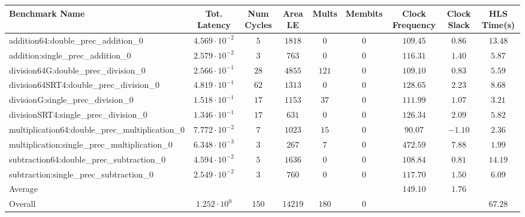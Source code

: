 \begin{tabular}{|l|c|c|c|c|c|c|c|c|}
\hline
Benchmark Name                                   & Tot. Latency            & Num Cycles & Area LE   & Mults   & Membits & Clock Frequency & Clock Slack & HLS Time(s) \\
\hline
addition64:double\_prec\_addition\_0             & $ 4.569 \cdot 10^{-2} $ & $ 5      $ & $ 1818  $ & $ 0   $ & $ 0   $ & $ 109.45      $ & $ 0.86    $ & $ 13.48   $ \\
addition:single\_prec\_addition\_0               & $ 2.579 \cdot 10^{-2} $ & $ 3      $ & $ 763   $ & $ 0   $ & $ 0   $ & $ 116.31      $ & $ 1.40    $ & $ 5.87    $ \\
division64G:double\_prec\_division\_0            & $ 2.566 \cdot 10^{-1} $ & $ 28     $ & $ 4855  $ & $ 121 $ & $ 0   $ & $ 109.10      $ & $ 0.83    $ & $ 5.59    $ \\
division64SRT4:double\_prec\_division\_0         & $ 4.819 \cdot 10^{-1} $ & $ 62     $ & $ 1313  $ & $ 0   $ & $ 0   $ & $ 128.65      $ & $ 2.23    $ & $ 8.68    $ \\
divisionG:single\_prec\_division\_0              & $ 1.518 \cdot 10^{-1} $ & $ 17     $ & $ 1153  $ & $ 37  $ & $ 0   $ & $ 111.99      $ & $ 1.07    $ & $ 3.21    $ \\
divisionSRT4:single\_prec\_division\_0           & $ 1.346 \cdot 10^{-1} $ & $ 17     $ & $ 631   $ & $ 0   $ & $ 0   $ & $ 126.34      $ & $ 2.09    $ & $ 5.82    $ \\
multiplication64:double\_prec\_multiplication\_0 & $ 7.772 \cdot 10^{-2} $ & $ 7      $ & $ 1023  $ & $ 15  $ & $ 0   $ & $ 90.07       $ & $ -1.10   $ & $ 2.36    $ \\
multiplication:single\_prec\_multiplication\_0   & $ 6.348 \cdot 10^{-3} $ & $ 3      $ & $ 267   $ & $ 7   $ & $ 0   $ & $ 472.59      $ & $ 7.88    $ & $ 1.99    $ \\
subtraction64:double\_prec\_subtraction\_0       & $ 4.594 \cdot 10^{-2} $ & $ 5      $ & $ 1636  $ & $ 0   $ & $ 0   $ & $ 108.84      $ & $ 0.81    $ & $ 14.19   $ \\
subtraction:single\_prec\_subtraction\_0         & $ 2.549 \cdot 10^{-2} $ & $ 3      $ & $ 760   $ & $ 0   $ & $ 0   $ & $ 117.70      $ & $ 1.50    $ & $ 6.09    $ \\
\hline
Average                                          & $                     $ & $        $ & $       $ & $     $ & $     $ & $ 149.10      $ & $ 1.76    $ & $         $ \\
\hline
Overall                                          & $ 1.252 \cdot 10^{0}  $ & $ 150    $ & $ 14219 $ & $ 180 $ & $ 0   $ & $             $ & $         $ & $ 67.28   $ \\
\hline
\end{tabular}
